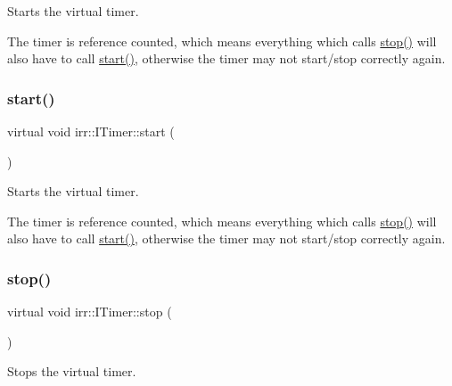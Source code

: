 Starts the virtual timer. 

The timer is reference counted, which means everything which calls \hyperlink{classirr_1_1ITimer_a649e7294fafc6e6de00f9a4dc6894c16}{stop()} will also have to call \hyperlink{classirr_1_1ITimer_a9467dc5a72de3869712715d0473c9697}{start()}, otherwise the timer may not start/stop correctly again. \mbox{\label{classirr_1_1ITimer_a9467dc5a72de3869712715d0473c9697}} 
\subsubsection{\texorpdfstring{start()}{start()}\hspace{0.1cm}{\footnotesize\ttfamily [2/2]}}
{\footnotesize\ttfamily virtual void irr\+::\+I\+Timer\+::start (\begin{DoxyParamCaption}{ }\end{DoxyParamCaption})\hspace{0.3cm}{\ttfamily [pure virtual]}}



Starts the virtual timer. 

The timer is reference counted, which means everything which calls \hyperlink{classirr_1_1ITimer_a649e7294fafc6e6de00f9a4dc6894c16}{stop()} will also have to call \hyperlink{classirr_1_1ITimer_a9467dc5a72de3869712715d0473c9697}{start()}, otherwise the timer may not start/stop correctly again. \mbox{\label{classirr_1_1ITimer_a649e7294fafc6e6de00f9a4dc6894c16}} 
\subsubsection{\texorpdfstring{stop()}{stop()}\hspace{0.1cm}{\footnotesize\ttfamily [1/2]}}
{\footnotesize\ttfamily virtual void irr\+::\+I\+Timer\+::stop (\begin{DoxyParamCaption}{ }\end{DoxyParamCaption})\hspace{0.3cm}{\ttfamily [pure virtual]}}



Stops the virtual timer. 

